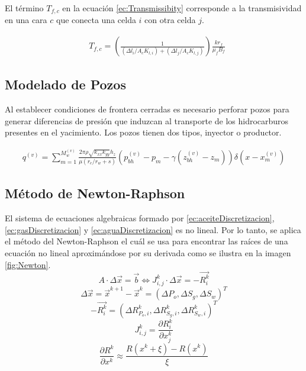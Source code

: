 El término $T_{f,c}$ en la ecuación \ref{ec:Transmissibity} corresponde a la transmisividad en una cara $c$ que conecta una celda $i$ con otra celda $j$.

\begin{align}
	\label{ec:Transmissibity}& T_{f,c} = \left(\frac{1}{(\Delta l_{i}/A_{c}K_{l,i})+(\Delta l_{j}/A_{c}K_{l,j})}\right)\frac{kr_{f}}{\mu_{f}B_{f}}
\end{align}
\subsection{Modelado de Pozos}
%
Al establecer condiciones de frontera cerradas es necesario perforar pozos para generar diferencias de presión que induzcan al transporte de los hidrocarburos presentes en el yacimiento. Los pozos tienen dos tipos, inyector o productor.

\begin{align}
	q^{(v)} = \sum_{m=1}^{M^{(v)}_{w}}\frac{2\pi\rho\sqrt{k_{xx}k_{yy}}h_{z}}{\mu\left(r_{e}/r_{w} +s\right)}\left(p_{bh}^{(v)}-p_{m}-\gamma\left(z_{bh}^{(v)}-z_{m}\right)\right)\delta\left(x-x_{m}^{(v)}\right)
\end{align}
%
\subsection{Método de Newton-Raphson}
%
El sistema de ecuaciones algebraicas formado por \ref{ec:aceiteDiscretizacion}, \ref{ec:gasDiscretizacion} y \ref{ec:aguaDiscretizacion} es no lineal. Por lo tanto, se aplica el método del Newton-Raphson el cuál se usa para encontrar las raíces de una ecuación no lineal aproximándose por su derivada como se ilustra en la imagen \ref{fig:Newton}.
\begin{equation}
A \cdot {\Delta \vec{x}} = \vec{b} \Leftrightarrow J^{k}_{i,j} \cdot {\Delta \vec{x}} = -\vec{R^{k}_{i}}
\end{equation}
\begin{equation}
\Delta \vec{x} = \vec{x}^{k+1} - \vec{x}^{k} = \left(\Delta P_o, \Delta S_g, \Delta S_w \right)^T
\end{equation}
\begin{equation}
-\vec{R^k_i} = \left(\Delta R^k_{P_o,i}, \Delta R^k_{S_g,i}, \Delta R^k_{S_w,i} \right)^T
\end{equation}
\begin{equation}
J^k_{i,j}=\frac{\partial R^k_i}{\partial x^k_j}	
\end{equation}
\begin{equation}
\frac{\partial R^k}{\partial x^k} \approx \frac{R\left(x^k + \xi \right) - R\left(x^k \right)}{\xi}
\end{equation}

